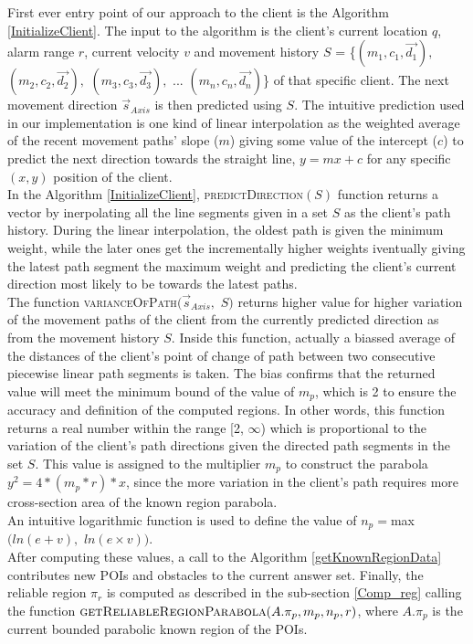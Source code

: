 First ever entry point of our approach to the client is the Algorithm \ref{InitializeClient}. The input to the algorithm is the client's current location $q$, alarm range $r$, current velocity $v$ and movement history $S$ = \{$(m_1, c_1, \vec{d_1}),$ $(m_2, c_2, \vec{d_2}),$ $(m_3, c_3, \vec{d_3}),$ ... $(m_n, c_n, \vec{d_n})$\}  of that specific client. The next movement direction $\vec{s}_{Axis}$ is then predicted using $S$. The intuitive prediction used in our implementation is one kind of linear interpolation as the weighted average of the recent movement paths' slope ($m$) giving some value of the intercept ($c$) to predict the next direction towards the straight line, $y=mx+c$ for any specific $(x,y)$ position of the client.\\

In the Algorithm \ref{InitializeClient}, \textsc{predictDirection}$(S)$ function returns a vector by inerpolating all the line segments given in a set $S$ as the client's path history. During the linear interpolation, the oldest path is given the minimum weight, while the later ones get the incrementally higher weights iventually giving the latest path segment the maximum weight and predicting the client's current direction most likely to be towards the latest paths.\\
The function \textsc{varianceOfPath$(\vec{s}_{Axis},$ $S)$} returns higher value for higher variation of the movement paths of the client from the currently predicted direction as from the movement history $S$. Inside this function, actually a biassed average of the distances of the client's point of change of path between two consecutive piecewise linear path segments is taken. The bias confirms that the returned value will meet the minimum bound of the value of $m_p$, which is 2 to ensure the accuracy and definition of the computed regions. In other words, this function returns a real number within the range [2, $\infty$) which is proportional to the variation of the client's path directions given the directed path segments in the set $S$. This value is assigned to the multiplier $m_p$ to construct the parabola $y^2 = 4*(m_p*r)*x$, since the more variation in the client's path requires more cross-section area of the known region parabola.\\
An intuitive logarithmic function is used to define the value of $n_p = $max$( ln( e + v ),$ $ln(e \times v))$.\\

After computing these values, a call to the Algorithm \ref{getKnownRegionData} contributes new POIs and obstacles to the current answer set. Finally, the reliable region $\pi_r$ is computed as described in the sub-section \ref{Comp_reg} calling the function $\textsc{getReliableRegionParabola}(A.\pi_p,m_p,n_p,r)$, where $A.\pi_p$ is the current bounded parabolic known region of the POIs.


